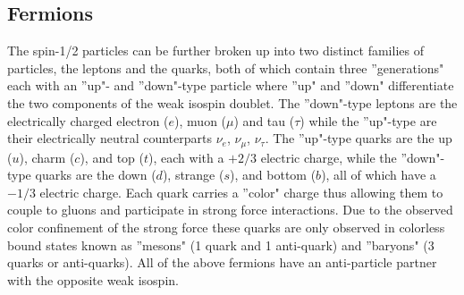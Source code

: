 \subsection{Fermions} \label{sec:theory:fermions}

The spin-1/2 particles can be further broken up into two distinct families of
particles, the leptons and the quarks, both of which contain three
''generations" each with an ''up"- and ''down"-type particle where ''up" and
''down" differentiate the two components of the weak isospin doublet.  The
''down"-type leptons are the electrically charged electron ($e$), muon ($\mu$)
and tau ($\tau$) while the ''up"-type are their electrically neutral
counterparts $\nu_e$, $\nu_\mu$, $\nu_\tau$. The ''up"-type quarks are the up
($u$), charm ($c$), and top ($t$), each with a $+2/3$ electric charge, while
the ''down"-type quarks are the down ($d$), strange ($s$), and bottom ($b$),
all of which have a $-1/3$ electric charge.  Each quark carries a ''color"
charge thus allowing them to couple to gluons and  participate in strong force
interactions.  Due to the observed color confinement of the strong force these
quarks are only observed in colorless bound states known as ''mesons" (1 quark
and 1 anti-quark) and ''baryons" (3 quarks or anti-quarks).  All of the above
fermions have an anti-particle partner with the opposite weak isospin.
